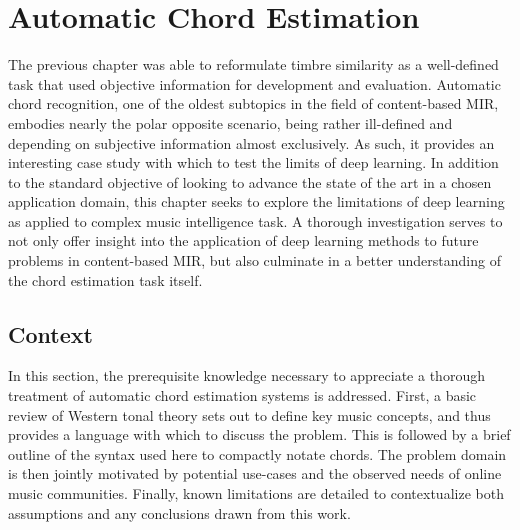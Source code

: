 \graphicspath{{5/figures/}}

\chapter{Automatic Chord Estimation}
\label{chp:chord_estimation}

The previous chapter was able to reformulate timbre similarity as a well-defined task that used objective information for development and evaluation.
Automatic chord recognition, one of the oldest subtopics in the field of content-based MIR, embodies nearly the polar opposite scenario, being rather ill-defined and depending on subjective information almost exclusively.
As such, it provides an interesting case study with which to test the limits of deep learning.
In addition to the standard objective of looking to advance the state of the art in a chosen application domain, this chapter seeks to explore the limitations of deep learning as applied to complex music intelligence task.
A thorough investigation serves to not only offer insight into the application of deep learning methods to future problems in content-based MIR, but also culminate in a better understanding of the chord estimation task itself.


\section{Context}
\label{sec:context}

In this section, the prerequisite knowledge necessary to appreciate a thorough treatment of automatic chord estimation systems is addressed.
First, a basic review of Western tonal theory sets out to define key music concepts, and thus provides a language with which to discuss the problem.
This is followed by a brief outline of the syntax used here to compactly notate chords.
The problem domain is then jointly motivated by potential use-cases and the observed needs of online music communities.
Finally, known limitations are detailed to contextualize both assumptions and any conclusions drawn from this work.



